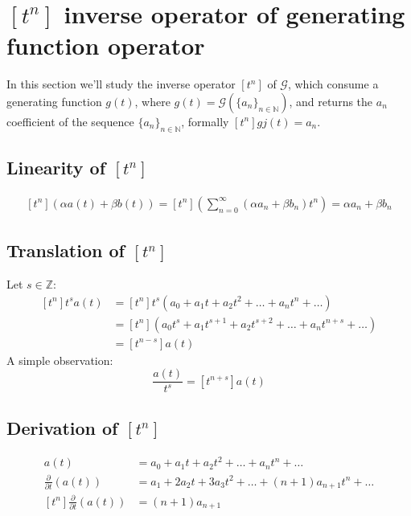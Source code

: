 
\section{ $[t^{n}] $ inverse operator of generating function operator}

In this section we'll study the inverse operator $[t^{n}] $ of
$\mathcal{G} $, which consume a generating function $g(t)$, where
$g(t) = \mathcal{G} (\{a_n\}_{n\in\mathbb{N} } )$, and returns the
$a_n$ coefficient of the sequence $\{a_n\}_{n\in\mathbb{N} }$,
formally $[t^{n}] gj(t) = a_n$.

\subsection{Linearity of $[t^{n}] $}
\begin{displaymath}
  \begin{split}
    [t^{n}] (\alpha a(t) + \beta b(t)) = [t^{n}]
    \left(\sum_{n=0}^{\infty}{(\alpha a_n + \beta b_n )t^n}\right) =
    \alpha a_n + \beta b_n
  \end{split}
\end{displaymath}

\subsection{Translation of $[t^{n}] $}
Let $s\in \mathbb{Z}$:
\begin{displaymath}
  \begin{split}
    [t^{n}] t^s a(t) &= [t^{n}] t^s (a_0 + a_1 t + a_2 t^2 + \ldots +
    a_n t^n + \ldots )\\
    &= [t^{n}] (a_0 t^s + a_1 t^{s+1} + a_2 t^{s+2} + \ldots + a_n
    t^{n+s} + \ldots )\\
    &= [t^{n-s}] a(t)
  \end{split}
\end{displaymath}
A simple observation:
\begin{displaymath}
  [t^{n}]  \frac{  a(t)}{t^s} = [t^{n+s}] a(t)
\end{displaymath}

\subsection{Derivation of $[t^{n}] $}
\begin{displaymath}
  \begin{split}
    a(t) &= a_0 + a_1 t + a_2 t^2 + \ldots + a_n t^n + \ldots \\
    \frac{\partial}{\partial t}\left(a(t) \right) &= a_1 + 2a_2 t +
    3a_3 t^2+\ldots + (n+1)a_{n+1} t^n + \ldots \\
    [t^{n}] \frac{\partial}{\partial t}\left(a(t) \right) &=
    (n+1)a_{n+1}
  \end{split}
\end{displaymath}

